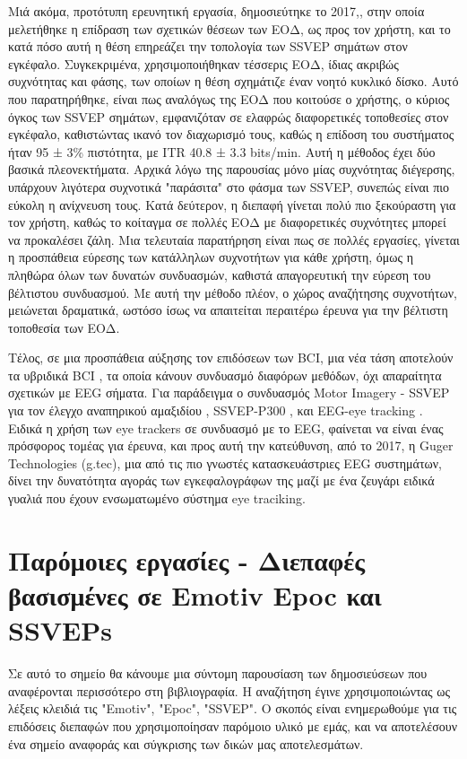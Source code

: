 \documentclass[11pt,a4paper,english,greek,twoside]{../Thesis}
\begin{document}
Μιά ακόμα, προτότυπη ερευνητική εργασία, δημοσιεύτηκε το 2017,\cite{Maye2017-ny}, στην οποία μελετήθηκε η επίδραση των σχετικών θέσεων των ΕΟΔ, ως προς τον χρήστη, και το κατά πόσο αυτή η θέση επηρεάζει την τοπολογία των SSVEP σημάτων στον εγκέφαλο. Συγκεκριμένα, χρησιμοποιήθηκαν τέσσερις ΕΟΔ, ίδιας ακριβώς συχνότητας και φάσης, των οποίων η θέση σχημάτιζε έναν νοητό κυκλικό δίσκο. Αυτό που παρατηρήθηκε, είναι πως αναλόγως της ΕΟΔ που κοιτούσε ο χρήστης, ο κύριος όγκος των SSVEP σημάτων, εμφανιζόταν σε ελαφρώς διαφορετικές τοποθεσίες στον εγκέφαλο, καθιστώντας ικανό τον διαχωρισμό τους, καθώς η επίδοση του συστήματος ήταν 95 ± 3\% πιστότητα, με ITR 40.8 ± 3.3 bits/min. Αυτή η μέθοδος έχει δύο βασικά πλεονεκτήματα. Αρχικά λόγω της παρουσίας μόνο μίας συχνότητας διέγερσης, υπάρχουν λιγότερα συχνοτικά "παράσιτα" στο φάσμα των SSVEP, συνεπώς είναι πιο εύκολη η ανίχνευση τους. Κατά δεύτερον, η διεπαφή γίνεται πολύ πιο ξεκούραστη για τον χρήστη, καθώς το κοίταγμα σε πολλές ΕΟΔ με διαφορετικές συχνότητες μπορεί να προκαλέσει ζάλη. Μια τελευταία παρατήρηση είναι πως σε πολλές εργασίες, γίνεται η προσπάθεια εύρεσης των κατάλληλων συχνοτήτων για κάθε χρήστη, όμως η πληθώρα όλων των δυνατών συνδυασμών, καθιστά απαγορευτική την εύρεση του βέλτιστου συνδυασμού. Με αυτή την μέθοδο πλέον, ο χώρος αναζήτησης συχνοτήτων, μειώνεται δραματικά, ωστόσο ίσως να απαιτείται περαιτέρω έρευνα για την βέλτιστη τοποθεσία των ΕΟΔ. 

\par Τέλος, σε μια προσπάθεια αύξησης τον επιδόσεων των BCI, μια νέα τάση αποτελούν τα υβριδικά BCI \cite{Hong2017-kl}, τα οποία κάνουν συνδυασμό διαφόρων μεθόδων, όχι απαραίτητα σχετικών με EEG σήματα. Για παράδειγμα ο συνδυασμός Motor Imagery - SSVEP για τον έλεγχο αναπηρικού αμαξιδίου \cite{Cao2014-wz}, SSVEP-P300 \cite{Chang2016-ax}, και EEG-eye tracking \cite{Kim2014-gg} \cite{Stawicki2017-ia}. Ειδικά η χρήση των eye trackers σε συνδυασμό με το EEG, φαίνεται να είναι ένας πρόσφορος τομέας για έρευνα, και προς αυτή την κατεύθυνση, από το 2017, η Guger Technologies (g.tec), μια από τις πιο γνωστές κατασκευάστριες EEG συστημάτων, δίνει την δυνατότητα αγοράς των εγκεφαλογράφων της μαζί με ένα ζευγάρι ειδικά γυαλιά που έχουν ενσωματωμένο σύστημα eye traciking.


\section{Παρόμοιες εργασίες - Διεπαφές βασισμένες σε Emotiv Epoc και SSVEPs}

\par Σε αυτό το σημείο θα κάνουμε μια σύντομη παρουσίαση των δημοσιεύσεων που αναφέρονται περισσότερο στη βιβλιογραφία. Η αναζήτηση έγινε χρησιμοποιώντας ως λέξεις κλειδιά τις "Emotiv", "Epoc", "SSVEP". Ο σκοπός είναι ενημερωθούμε για τις επιδόσεις διεπαφών που χρησιμοποίησαν παρόμοιο υλικό με εμάς, και να αποτελέσουν ένα σημείο αναφοράς και σύγκρισης των δικών μας αποτελεσμάτων.
\end{document}
